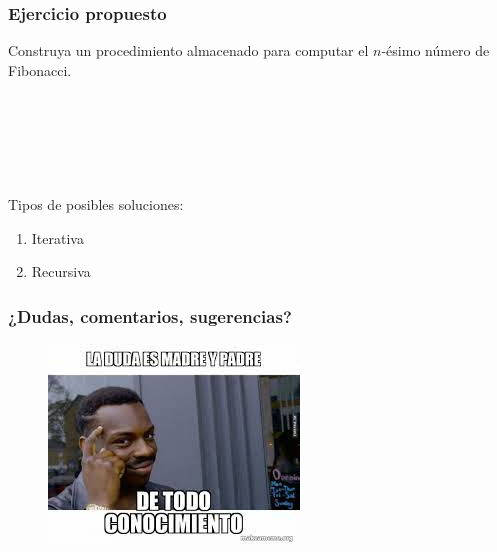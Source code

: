 \documentclass[
	10pt, %
	aspectratio=169, %
]{beamer}
\begin{document}

\begin{frame}[fragile]
	
	\frametitle{Ejercicio propuesto}
	
	Construya un procedimiento almacenado para computar el $n$-ésimo número de Fibonacci.
	
	\pause
	
	\ 
	
	\ 
	
	\ 
	
	Tipos de posibles soluciones: 
	
	\begin{enumerate}
		
		\item Iterativa
		
		\item Recursiva
		
	\end{enumerate}
	
\end{frame}


\begin{frame}[fragile]
	
	\frametitle{¿Dudas, comentarios, sugerencias?}
	
	\begin{figure}[h]
		\centering
		\includegraphics[scale=1.1]{duda.jpeg}
	\end{figure}
	
\end{frame}



\end{document}
